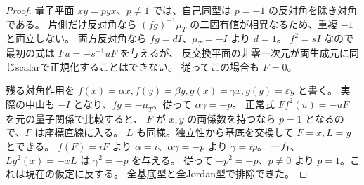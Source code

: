 \begin{proof}
量子平面 $xy=p yx$、$p\ne1$ では、自己同型は $p=-1$ の反対角を除き対角である。
片側だけ反対角なら $(fg)^{-1}\mu_T$ の二固有値が相異なるため、重複 $-1$ と両立しない。
両方反対角なら $fg=dI$、$\mu_T=-I$ より $d=1$。
$f^2=sI$ なので最初の式は $F u=-s^{-1}uF$ を与えるが、
反交換平面の非零一次元が両生成元に同じscalarで正規化することはできない。
従ってこの場合も $F=0$。

残る対角作用を
$f(x)=\alpha x,f(y)=\beta y,g(x)=\gamma x,g(y)=\varepsilon y$ と書く。
実際の中山も $-I$ となり、$fg=-\mu_T$、従って $\alpha\gamma=-p$。
正常式 $F f^2(u)=-uF$ を元の量子関係で比較すると、
$F$ が $x,y$ の両係数を持つなら $p=1$ となるので、$F$ は座標直線に入る。
$L$ も同様。独立性から基底を交換して $F=x,L=y$ とできる。
$f(F)=iF$ より $\alpha=i$、$\alpha\gamma=-p$ より $\gamma=i p$。
一方、$L g^2(x)=-xL$ は $\gamma^2=-p$ を与える。
従って $-p^2=-p$、$p\ne0$ より $p=1$。これは現在の仮定に反する。
全基底型と全Jordan型で排除できた。
\end{proof}
